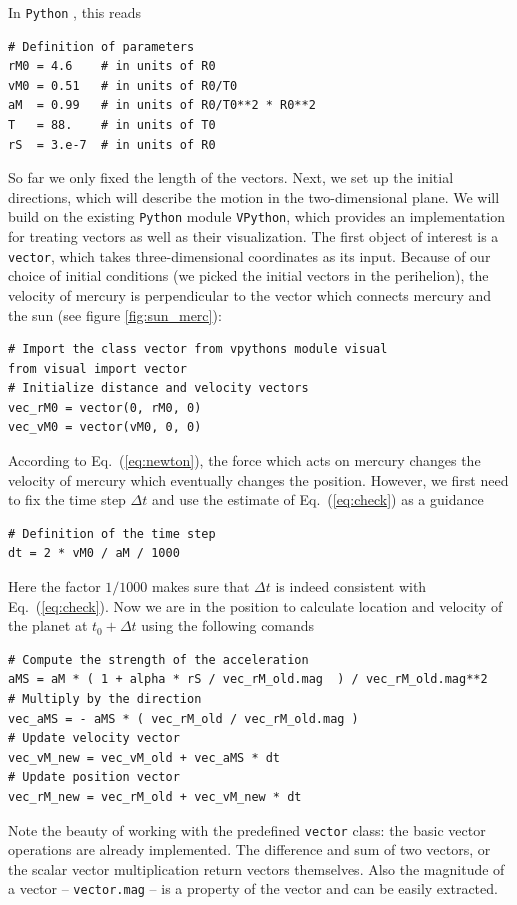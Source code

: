 \documentclass[12pt]{iopart}
\newcommand{\python}[0]{\texttt{Python} }
\begin{document}
In \python, this reads
\begin{lstlisting}
# Definition of parameters
rM0 = 4.6    # in units of R0
vM0 = 0.51   # in units of R0/T0
aM  = 0.99   # in units of R0/T0**2 * R0**2
T   = 88.    # in units of T0
rS  = 3.e-7  # in units of R0
\end{lstlisting}
So far we only fixed the length of the vectors.
Next, we set up the initial directions, which will describe the motion in the two-dimensional plane.  We will build on the existing \python module \texttt{VPython}, which provides  an implementation for treating vectors as well as their visualization.
The first object of interest is a \texttt{vector}, which takes three-dimensional coordinates as its input.  Because of our choice of initial conditions (we picked the initial vectors in the perihelion), the velocity of mercury is perpendicular to the vector which connects mercury and the sun (see figure \ref{fig:sun_merc}):
\begin{lstlisting}
# Import the class vector from vpythons module visual
from visual import vector
# Initialize distance and velocity vectors
vec_rM0 = vector(0, rM0, 0)
vec_vM0 = vector(vM0, 0, 0)
\end{lstlisting}
According to Eq.~(\ref{eq:newton}), the force which acts on mercury changes the velocity of mercury which eventually changes the position. However, we first need to fix the time step $\Delta t$ and use the estimate
of Eq.~(\ref{eq:check}) as a guidance 
\begin{lstlisting}
# Definition of the time step
dt = 2 * vM0 / aM / 1000
\end{lstlisting}
Here the factor $1/1000$ makes sure that $\Delta t$ is indeed consistent with Eq.~(\ref{eq:check}).
%
%
Now we are in the position to calculate
location and velocity of the planet at $t_0+\Delta t$ using the following comands
\begin{lstlisting}
# Compute the strength of the acceleration
aMS = aM * ( 1 + alpha * rS / vec_rM_old.mag  ) / vec_rM_old.mag**2
# Multiply by the direction
vec_aMS = - aMS * ( vec_rM_old / vec_rM_old.mag )
# Update velocity vector
vec_vM_new = vec_vM_old + vec_aMS * dt
# Update position vector
vec_rM_new = vec_rM_old + vec_vM_new * dt
\end{lstlisting}
Note the beauty of working with the predefined \texttt{vector} class: the basic vector operations are already implemented.  The difference and sum of two vectors, or the scalar vector multiplication return vectors themselves.  Also the magnitude of a vector -- \texttt{vector.mag} -- is a property of the vector and can be easily extracted.
\end{document}
